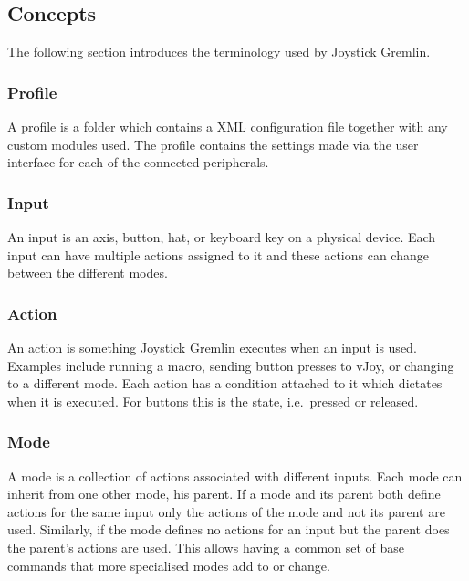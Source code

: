 \documentclass[a4, 10pt]{article}
\newcommand{\JG}{Joystick Gremlin}
\begin{document}
\subsection{Concepts}
\label{sec:concepts}

The following section introduces the terminology used by \JG{}.


\subsubsection{Profile}
A profile is a folder which contains a XML configuration file together
with any custom modules used. The profile contains the settings made via
the user interface for each of the connected peripherals.

\subsubsection{Input}
An input is an axis, button, hat, or keyboard key on a physical device.
Each input can have multiple actions assigned to it and these actions
can change between the different modes.

\subsubsection{Action}
An action is something \JG{} executes when an input is used. Examples
include running a macro, sending button presses to vJoy, or changing to a
different mode. Each action has a condition attached to it which
dictates when it is executed. For buttons this is the state, i.e.\
pressed or released.

\subsubsection{Mode}
A mode is a collection of actions associated with different inputs.
Each mode can inherit from one other mode, his parent. If a mode and its
parent both define actions for the same input only the actions of the
mode and not its parent are used. Similarly, if the mode defines no
actions for an input but the parent does the parent's actions are used.
This allows having a common set of base commands that more specialised
modes add to or change.



\end{document}
